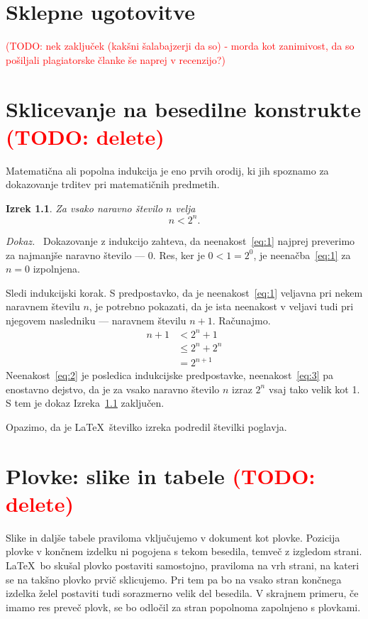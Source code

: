 \documentclass[a4paper, 12pt]{book}
\newcommand{\TODO}[1]{\textcolor{red}{(TODO: #1)}}
\newtheorem{izrek}{Izrek}[chapter]
\newenvironment{dokaz}{\emph{Dokaz.}\ }{\hspace{\fill}{$\Box$}}
\begin{document}
\chapter{Sklepne ugotovitve}
\TODO{nek zaključek (kakšni šalabajzerji da so) - morda kot zanimivost, da
so pošiljali plagiatorske članke še naprej v recenzijo?}



\chapter*{Sklicevanje na besedilne konstrukte \TODO{delete}}


\label{ch1}
Matematična ali popolna indukcija je eno prvih orodij, ki jih spoznamo za dokazovanje trditev pri matematičnih predmetih. 
\begin{izrek}
\label{iz:1}
Za vsako naravno število $n$ velja
\begin{equation}
n < 2^n.
\label{eq:1}
\end{equation}
\end{izrek}
\begin{dokaz}
Dokazovanje z indukcijo zahteva, da neenakost~\eqref{eq:1} najprej preverimo
za najmanjše naravno število --- $0$. Res, ker je $0 < 1 = 2^0$, je
neenačba~\eqref{eq:1} za $n=0$ izpolnjena.

Sledi indukcijski korak. S predpostavko, da je neenakost~\eqref{eq:1} veljavna
pri nekem naravnem številu $n$, je potrebno pokazati, da je ista neenakost v
veljavi tudi pri njegovem nasledniku --- naravnem številu $n+1$. Računajmo.
\begin{align}
n+1 &< 2^n + 1  \label{eq:2}\\
    &\le 2^n + 2^n \label{eq:3}\\
    &= 2^{n+1} \nonumber
\end{align} 
Neenakost~\eqref{eq:2} je posledica indukcijske predpostavke,
neenakost~\eqref{eq:3} pa enostavno dejstvo, da je za vsako naravno število $n$
izraz $2^n$ vsaj tako velik kot 1. S tem je dokaz Izreka~\ref{iz:1} zaključen.
\end{dokaz}

Opazimo, da je \LaTeX\ številko izreka podredil številki poglavja.



\chapter*{Plovke: slike in tabele \TODO{delete}}
\label{ch2}
Slike in daljše tabele praviloma vključujemo v dokument kot plovke. Pozicija plovke v končnem izdelku ni pogojena s tekom besedila, temveč z izgledom strani. \LaTeX\ bo skušal plovko postaviti samostojno, praviloma na vrh strani, na kateri se na takšno plovko prvič sklicujemo. Pri tem pa bo na vsako stran končnega izdelka želel postaviti tudi sorazmerno velik del besedila. V skrajnem primeru, če imamo res preveč plovk, se bo odločil za stran popolnoma zapolnjeno s plovkami.
\end{document}
